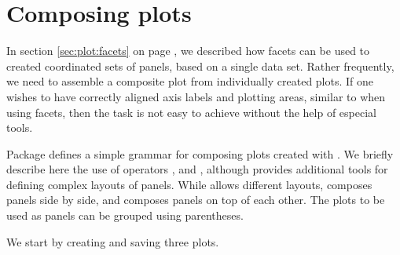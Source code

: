 \documentclass[krantz2]{krantz}\usepackage{knitr}
\begin{document}
\section{Composing plots}
In section \ref{sec:plot:facets} on page \pageref{sec:plot:facets}, we described how facets can be used to created coordinated sets of panels, based on a single data set. Rather frequently, we need to assemble a composite plot from individually created plots. If one wishes to have correctly aligned axis labels and plotting areas, similar to when using facets, then the task is not easy to achieve without the help of especial tools.

Package  defines a simple grammar for composing plots created with \ggplot. We briefly describe here the use of operators \Roperator{+}, \Roperator{|} and \Roperator{/}, although  provides additional tools for defining complex layouts of panels. While \Roperator{+} allows different layouts, \Roperator{|} composes panels side by side, and \Roperator{/} composes panels on top of each other. The plots to be used as panels can be grouped using parentheses.

We start by creating and saving three plots.
\begin{knitrout}\footnotesize
{}\color{fgcolor}\begin{kframe}
\begin{alltt}
 \hlkwb{<-}    \hlstd{=}  \hlopt{+}
        \hlstd{()} \hlopt{+}
        \hlstd{(} \hlstd{=} \hlstd{)}
 \hlkwb{<-}    \hlstd{=}  \hlopt{+}
        \hlstd{()} \hlopt{+}
        \hlstd{(} \hlstd{=} \hlstd{)}
 \hlkwb{<-}  \hlstd{(} \hlopt{+}
        \hlstd{()} \hlopt{+}
        \hlstd{(} \hlstd{=}
                \hlstd{(} \hlstd{=} \hlstd{,}  \hlstd{=} \hlstd{,}  \hlstd{=} \hlstd{))}
\end{alltt}
\end{kframe}
\end{knitrout}
\end{document}
